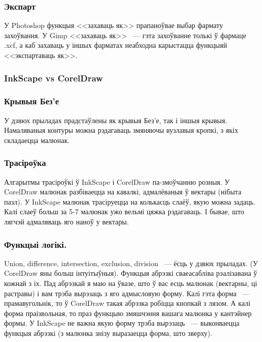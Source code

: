 \documentclass[10pt, a5paper]{article}
\begin{document}
\subsubsection*{Экспарт}

У Photoshop  функцыя <<захаваць як>> прапаноўвае выбар фармату захоўвання.
У Gimp <<захаваць як>> ~--- гэта захоўванне толькі ў фармаце .xcf, а каб захаваць у іншых фарматах неабходна карыстацца функцыяй <<экспартаваць як>>.



\subsubsection*{\textbf{InkScape vs CorelDraw}}

\subsubsection*{Крывыя Без’е}

У дзвюх прыладах прадстаўлены як крывыя Без’е, так і іншыя крывыя. Намаляваныя контуры можна рэдагаваць змяняючы вузлавыя кропкі, з якіх складаецца малюнак.

\subsubsection*{Трасіроўка}

Алгарытмы трасіроўкі ў InkScape і CorelDraw па-змоўчанню розныя. У CorelDraw малюнак разбіваецца на кавалкі, адмалёваныя ў вектары (нібыта пазл).
У InkScape малюнак трасіруецца на колькасць слаёў, якую можна задаць. Калі слаеў больш за 5-7 малюнак ужо вельмі цяжка рэдагаваць. І бывае, што лягчэй адмаляваць яго наноў у вектары.

\subsubsection*{Функцыі логікі.}

Union, difference, intersection, exclusion, division ~--- ёсць у дзвюх прыладах. (У CorelDraw яны больш інтуітыўныя).
Функцыя абрэзкі сваеасабліва рэалізавана ў кожнай з іх. Пад абрэзкай я маю на ўвазе, што ў вас есць малюнак (вектарны, ці растравы) і вам трэба вырэзаць з яго адмысловую форму.
Калі гэта форма ~--- прамавугольнік, то ў CorelDraw такая абрэзка робіцца кнопкай з лязом. А калі форма праізвольная, то праз функцыю змяшчэння вашага малюнка у кантэйнер формы.
У InkScape не важна якую форму трэба вырэзаць ~--- выконваецца функцыя абрэзкі (з малюнка знізу выразаецца форма, што зверху).
\end{document}
